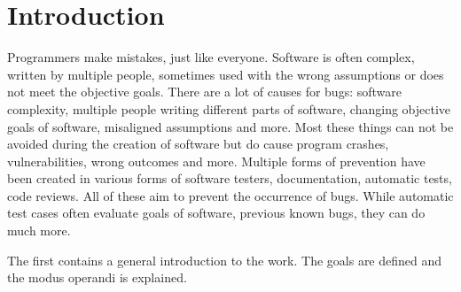 \chapter{Introduction}
\label{cha:intro}
Programmers make mistakes, just like everyone.
Software is often complex, written by multiple people, sometimes used with the wrong assumptions or does not meet the objective goals. 
There are a lot of causes for bugs: software complexity, multiple people writing different parts of software, changing objective goals of software, misaligned assumptions and more. Most these things can not be avoided during the creation of software but do cause program crashes, vulnerabilities, wrong outcomes and more.
Multiple forms of prevention have been created in various forms of software testers, documentation, automatic tests, code reviews. All of these aim to prevent the occurrence of bugs. While automatic test cases often evaluate goals of software, previous known bugs, they can do much more.



The first contains a general introduction to the work. The goals are defined and the modus operandi is explained.

